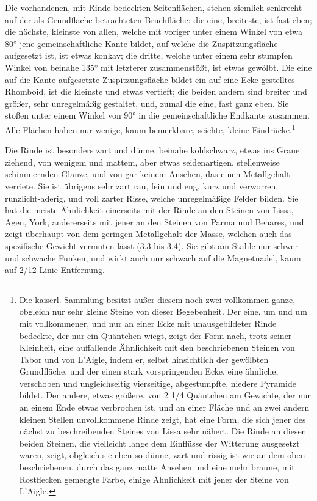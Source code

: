 \documentclass[a4paper, 11pt, oneside, german]{article}
\begin{document}
Die vorhandenen, mit Rinde bedeckten Seitenflächen, stehen ziemlich senkrecht auf der als Grundfläche betrachteten Bruchfläche: die eine, breiteste, ist fast eben; die nächste, kleinste von allen, welche mit voriger unter einem Winkel von etwa 80° jene gemeinschaftliche Kante bildet, auf welche die Zuspitzungsfläche aufgesetzt ist, ist etwas konkav; die dritte, welche unter einem sehr stumpfen Winkel von beinahe 135° mit letzterer zusammenstößt, ist etwas gewölbt. Die eine auf die Kante aufgesetzte Zuspitzungsfläche bildet ein auf eine Ecke gestelltes Rhomboid, ist die kleinste und etwas vertieft; die beiden andern sind breiter und größer, sehr unregelmäßig gestaltet, und, zumal die eine, fast ganz eben. Sie stoßen unter einem Winkel von 90° in die gemeinschaftliche Endkante zusammen. Alle Flächen haben nur wenige, kaum bemerkbare, seichte, kleine Eindrücke.\footnote{Die kaiserl. Sammlung besitzt außer diesem noch zwei vollkommen ganze, obgleich nur sehr kleine Steine von dieser Begebenheit. Der eine, um und um mit vollkommener, und nur an einer Ecke mit unausgebildeter Rinde bedeckte, der nur ein Quäntchen wiegt, zeigt der Form nach, trotz seiner Kleinheit, eine auffallende Ähnlichkeit mit den beschriebenen Steinen von Tabor und von L'Aigle, indem er, selbst hinsichtlich der gewölbten Grundfläche, und der einen stark vorspringenden Ecke, eine ähnliche, verschoben und ungleichseitig vierseitige, abgestumpfte, niedere Pyramide bildet. Der andere, etwas größere, von 2 1/4 Quäntchen am Gewichte, der nur an einem Ende etwas verbrochen ist, und an einer Fläche und an zwei andern kleinen Stellen unvollkommene Rinde zeigt, hat eine Form, die sich jener des nächst zu beschreibenden Steines von Lissa sehr nähert. Die Rinde an diesen beiden Steinen, die vielleicht lange dem Einflüsse der Witterung ausgesetzt waren, zeigt, obgleich sie eben so dünne, zart und rissig ist wie an dem oben beschriebenen, durch das ganz matte Ansehen und eine mehr braune, mit Rostflecken gemengte Farbe, einige Ähnlichkeit mit jener der Steine von L'Aigle.}

Die Rinde ist besonders zart und dünne, beinahe kohlschwarz, etwas ins Graue ziehend, von wenigem und mattem, aber etwas seidenartigen, stellenweise schimmernden Glanze, und von gar keinem Ansehen, das einen Metallgehalt verriete. Sie ist übrigens sehr zart rau, fein und eng, kurz und verworren, runzlicht-aderig, und voll zarter Risse, welche unregelmäßige Felder bilden. Sie hat die meiste Ähnlichkeit einerseits mit der Rinde an den Steinen von Lissa, Agen, York, andererseits mit jener an den Steinen von Parma und Benares, und zeigt überhaupt von dem geringen Metallgehalt der Masse, welchen auch das spezifische Gewicht vermuten lässt (3,3 bis 3,4). Sie gibt am Stahle nur schwer und schwache Funken, und wirkt auch nur schwach auf die Magnetnadel, kaum auf 2/12 Linie Entfernung.
\end{document}
